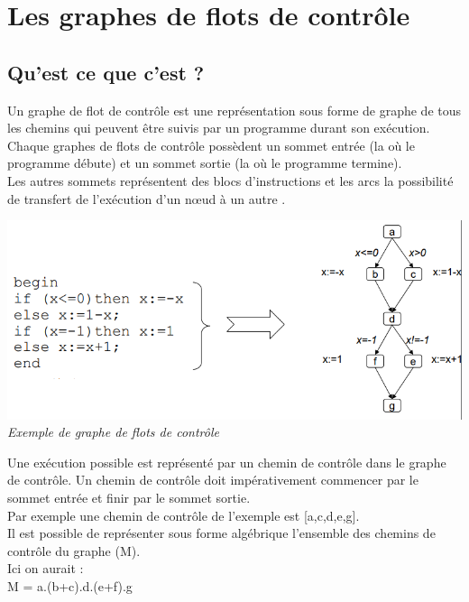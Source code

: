 \documentclass[a4paper,twoside,12pt,openright]{report}
\begin{document}
\section{Les graphes de flots de contrôle}
\subsection{Qu'est ce que c'est ?}
Un graphe de flot de contrôle est une représentation sous forme de graphe de tous les chemins qui peuvent être suivis par un programme durant son exécution.\\
Chaque graphes de flots de contrôle possèdent un sommet entrée (la où le programme débute) et un sommet sortie (la où le programme termine).\\
Les autres sommets représentent des blocs d'instructions et les arcs la possibilité de transfert de l'exécution d'un nœud à un autre \cite{ref11}.

\begin{center}
\includegraphics[scale=0.7]{Image/GFC.png}\\
\itshape{Exemple de graphe de flots de contrôle\cite{ref11}}
\end{center}

Une exécution possible est représenté par un chemin de contrôle dans le graphe de contrôle. Un chemin de contrôle doit impérativement commencer par le sommet entrée et finir par le sommet sortie.\\
Par exemple une chemin de contrôle de l'exemple est [a,c,d,e,g].\\
Il est possible de représenter sous forme algébrique l'ensemble des chemins de contrôle du graphe (M).\\
Ici on aurait :\\
M = a.(b+c).d.(e+f).g\\
\end{document}

